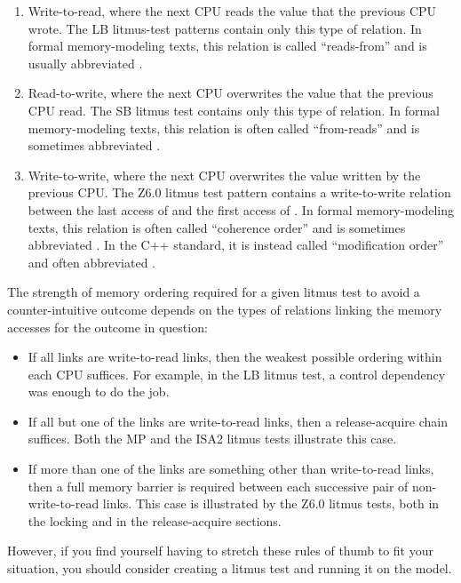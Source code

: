 \begin{enumerate}
\item	Write-to-read, where the next CPU reads the value that the
	previous CPU wrote.
	The LB litmus-test patterns contain only this type of relation.
	In formal memory-modeling texts, this relation is called
        ``reads-from'' and is usually abbreviated .

\item	Read-to-write, where the next CPU overwrites the value that the
	previous CPU read.
	The SB litmus test contains only this type of relation.
	In formal memory-modeling texts, this relation is often called
	``from-reads'' and is sometimes abbreviated .

\item	Write-to-write, where the next CPU overwrites the value written
	by the previous CPU\@.
	The Z6.0 litmus test pattern contains a write-to-write relation
	between the last access of  and the first access of
	.
	In formal memory-modeling texts, this relation is often called
	``coherence order'' and is sometimes abbreviated .
	In the C++ standard, it is instead called ``modification order''
	and often abbreviated .
\end{enumerate}

The strength of memory ordering required for a given litmus test to
avoid a counter-intuitive outcome depends on the types of relations
linking the memory accesses for the outcome in question:

\begin{itemize}
\item	If all links are write-to-read links, then the weakest
	possible ordering within each CPU suffices.
	For example, in the LB litmus test, a control dependency
	was enough to do the job.

\item	If all but one of the links are write-to-read links, then a
	release-acquire chain suffices.
	Both the MP and the ISA2 litmus tests illustrate this case.

\item	If more than one of the links are something other than
	write-to-read links, then a full memory barrier is required
	between each successive pair of non-write-to-read links.
	This case is illustrated by the Z6.0 litmus tests, both in the
	locking and in the release-acquire sections.
\end{itemize}

However, if you find yourself having to stretch these rules of thumb
to fit your situation, you should consider creating a litmus test and
running it on the model.
